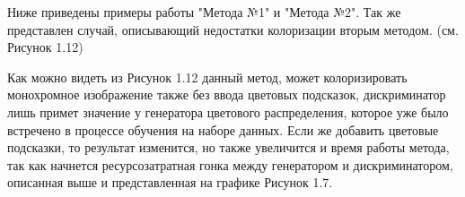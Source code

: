 \begin{landscape}
\begin{table}[]
\begin{tabular}{lll}
	\end{tabular}
\end{table}
\end{landscape}

Ниже приведены примеры работы "Метода №1" и "Метода №2". Так же представлен случай, описывающий недостатки колоризации вторым методом. (см. Рисунок 1.12)

\begin{figure}[ht!]
\end{figure}

Как можно видеть из Рисунок 1.12 данный метод, может колоризировать монохромное изображение также без ввода цветовых подсказок, дискриминатор лишь примет значение у генератора цветового распределения, которое уже было встречено в процессе обучения на наборе данных. Если же добавить цветовые подсказки, то результат изменится, но также увеличится и время работы метода, так как начнется ресурсозатратная гонка между генератором и дискриминатором, описанная выше и представленная на графике Рисунок 1.7.


\begin{figure}[ht!]
\end{figure}

